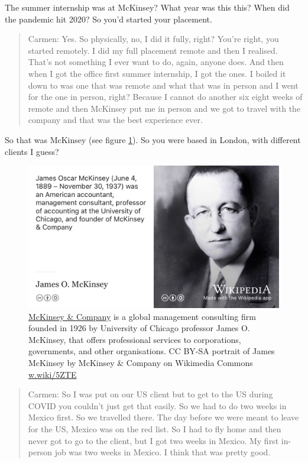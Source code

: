 \documentclass[
]{book}
\begin{document}
The summer internship was at McKinsey? What year was this this? When did the pandemic hit 2020? So you'd started your placement.

\begin{quote}
Carmen: Yes. So physically, no, I did it fully, right? You're right, you started remotely. I did my full placement remote and then I realised. That's not something I ever want to do, again, anyone does. And then when I got the office first summer internship, I got the ones. I boiled it down to was one that was remote and what that was in person and I went for the one in person, right? Because I cannot do another six eight weeks of remote and then McKinsey put me in person and we got to travel with the company and that was the best experience ever.
\end{quote}

So that was McKinsey (see figure \ref{fig:mckinsey-fig}). So you were based in London, with different clients I guess?

\begin{figure}

{\centering \includegraphics[width=0.99\linewidth]{images/mckinsey} 

}

\caption{\href{https://en.wikipedia.org/wiki/McKinsey_\%26_Company}{McKinsey \& Company} is a global management consulting firm founded in 1926 by University of Chicago professor James O. McKinsey, that offers professional services to corporations, governments, and other organisations. CC BY-SA portrait of James McKinsey by McKinsey \& Company on Wikimedia Commons \href{https://w.wiki/5ZTE}{w.wiki/5ZTE}}\label{fig:mckinsey-fig}
\end{figure}



\begin{quote}
Carmen: So I was put on our US client but to get to the US during COVID you couldn't just get that easily. So we had to do two weeks in Mexico first. So we travelled there. The day before we were meant to leave for the US, Mexico was on the red list. So I had to fly home and then never got to go to the client, but I got two weeks in Mexico. My first in-person job was two weeks in Mexico. I think that was pretty good.
\end{quote}
\end{document}
